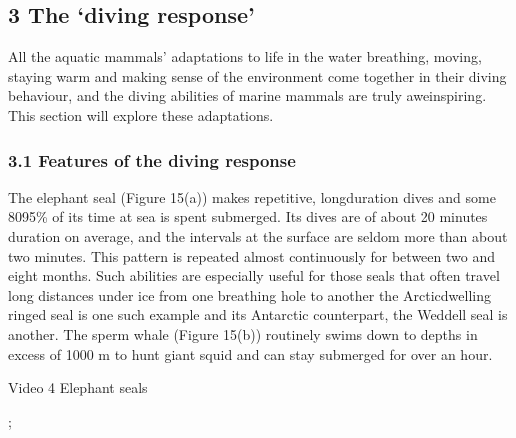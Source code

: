 \documentclass[letterpaper,10pt,english]{sphinxmanual}
\begin{document}
\subsection{3 The ‘diving response’}
\label{\detokenize{content/session_00/Part_00_03:3-The-_u2018diving-response_u2019}}\label{\detokenize{content/session_00/Part_00_03::doc}}
All the aquatic mammals’ adaptations to life in the water \textendash{} breathing, moving, staying warm and making sense of the environment \textendash{} come together in their diving behaviour, and the diving abilities of marine mammals are truly awe\sphinxhyphen{}inspiring. This section will explore these adaptations.


\subsubsection{3.1 Features of the diving response}
\label{\detokenize{content/session_00/Part_00_03:3.1-Features-of-the-diving-response}}
The elephant seal (Figure 15(a)) makes repetitive, long\sphinxhyphen{}duration dives and some 80\textendash{}95\% of its time at sea is spent submerged. Its dives are of about 20 minutes duration on average, and the intervals at the surface are seldom more than about two minutes. This pattern is repeated almost continuously for between two and eight months. Such abilities are especially useful for those seals that often travel long distances under ice from one breathing hole to another \textendash{} the Arctic\sphinxhyphen{}dwelling ringed seal is
one such example and its Antarctic counterpart, the Weddell seal is another. The sperm whale (Figure 15(b)) routinely swims down to depths in excess of 1000 m to hunt giant squid and can stay submerged for over an hour.

Video 4 Elephant seals









 ;
\end{document}
